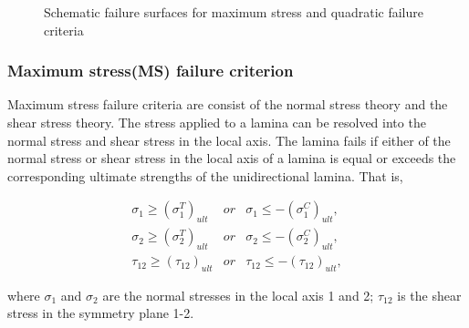 \documentclass[letterpaper]{IEEEtran}
\begin{document}
\begin{figure}[b]
\centering
{}
\caption{Schematic failure surfaces for maximum stress and quadratic failure
criteria}
\label{fig:failure_surface}
\end{figure}

\subsubsection{Maximum stress(MS) failure criterion}

Maximum stress failure criteria are consist of the normal stress theory and the
shear stress theory. The stress applied to a lamina can be resolved into the
normal stress and shear stress in the local axis. The lamina fails if either of
the normal stress or shear stress in the local axis of a lamina is equal or
exceeds the corresponding ultimate strengths of the unidirectional lamina.  That
is,

\begin{equation}
	\begin{array}{lll}
		\sigma_1 \geq (\sigma _1^{T})_{ult} & \textstyle{ or } &  \sigma_1 \leq -(\sigma _1^{C})_{ult} \textstyle{,} \\
		\sigma_2 \geq (\sigma _2^{T})_{ult} & \textstyle{ or } &   \sigma_2 \leq -(\sigma _2^{C})_{ult} \textstyle{,} \\
		\tau_{12} \geq (\tau_{12})_{ult}    & \textstyle{ or } &     \tau_{12} \leq -(\tau_{12})_{ult}  \textstyle{,}
\end{array}
\end{equation}

where $\sigma_1$ and $\sigma_2$ are the normal stresses in the local axis 1 and 2;
$\tau_{12}$ is the shear stress in the symmetry plane 1-2.
\end{document}

